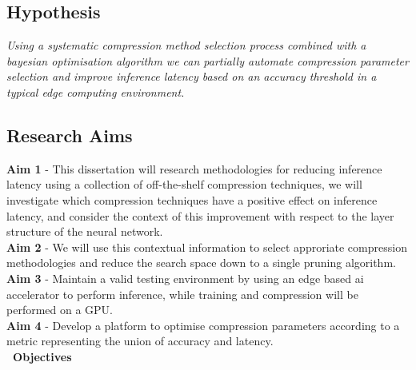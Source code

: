 \documentclass[../Dissertation.tex]{subfiles}
\begin{document}
\subsection{Hypothesis}
\emph{Using a systematic compression method selection process combined with a bayesian optimisation algorithm we can partially automate compression parameter selection and improve inference latency based on an accuracy threshold in a typical edge computing environment.}

\subsection{Research Aims}
\textbf{Aim 1}\label{Aim1} - This dissertation will research methodologies for reducing inference latency using a collection of off-the-shelf compression techniques, we will investigate which compression techniques have a positive effect on inference latency, and consider the context of this improvement with respect to the layer structure of the neural network.\\ 
\noindent\textbf{Aim 2}\label{Aim2} - We will use this contextual information to select approriate compression methodologies and reduce the search space down to a single pruning algorithm.\\
\noindent\textbf{Aim 3}\label{Aim3} - Maintain a valid testing environment by using an edge based ai accelerator to perform inference, while training and compression will be performed on a GPU.\\
\noindent\textbf{Aim 4}\label{Aim4} - Develop a platform to optimise compression parameters according to a metric representing the union of accuracy and latency.\\
\textbf{\large~Objectives}
\end{document}
